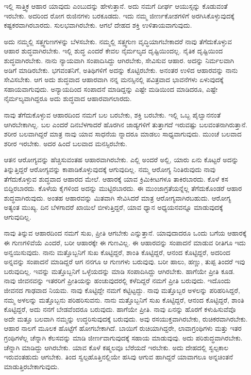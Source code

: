 ಇಲ್ಲಿ ಸಾತ್ತ್ವಿಕ ಆಹಾರ ಯಾವುದು ಎಂಬುದನ್ನು ಹೇಳುತ್ತಾನೆ. ಅದು ನಮಗೆ ದೀರ್ಘ ಆಯುಸ್ಸನ್ನು ಕೊಡುವಂತೆ ಇರಬೇಕು. ಅದರಿಂದ ರೋಗ ರುಜಿನಗಳು ಬರಕೂಡದು. ಇದು ನಮ್ಮ ಜೀರ್ಣಕೋಶಗಳಿಗೆ ಅರಗಿಸಿಕೊಳ್ಳುವುದಕ್ಕೆ ಕಷ್ಟಕರವಾಗಿರಬಾರದು. ಸುಲಭವಾಗಿರಬೇಕು. ಆಗಲೆ ದೇಹದ ಶಕ್ತಿ ಉಳಿತಾಯವಾಗುವುದು.

ಅದು ನಮ್ಮಲ್ಲಿ ಸತ್ತ್ವಗುಣಗಳನ್ನು ಬೆಳಸಬೇಕು. ನಮ್ಮಲ್ಲಿ ಸತ್ತ್ವಗುಣ ವೃದ್ಧಿಯಾಗಬೇಕಾದರೆ ನಾವು ತೆಗೆದುಕೊಳ್ಳುವ ಆಹಾರ ಶುದ್ಧವಾಗಿರಬೇಕು. ಇಲ್ಲಿ ಶುದ್ಧ ಎಂದರೆ ಕೇವಲ ನೈರ್ಮಲ್ಯದ ದೃಷ್ಟಿಯಿಂದಲ್ಲ. ನೈತಿಕ ದೃಷ್ಟಿಯಿಂದ ಶುದ್ಧವಾಗಿರಬೇಕು. ನಾನು ನ್ಯಾಯವಾಗಿ ಸಂಪಾದಿಸಿದ್ದು ಆಗಿರಬೇಕು, ಸೇವಿಸುವ ಆಹಾರ. ಅದನ್ನು ನಿರ್ಮಲವಾಗಿ ಅಡಿಗೆ ಮಾಡಿರಬೇಕು. ಭಗವಂತನಿಗೆ, ಅತಿಥಿಗಳಿಗೆ ಅದನ್ನು ಕೊಟ್ಟಿರಬೇಕು. ಅನಂತರ ಉಳಿದ ಆಹಾರವನ್ನು ನಾನು ಸೇವಿಸಬೇಕು. ಆಗ ಅದು ಶುದ್ಧವಾದ ಆಹಾರವಾಗಿ ನನ್ನ ಮನಸ್ಸಿನಲ್ಲಿ ಪವಿತ್ರವಾದ ಭಾವನೆಗಳು ಏಳುವುದಕ್ಕೆ ಸಹಾಯವಾಗುವುದು. ಅನ್ಯಾಯದಿಂದ ಸಂಪಾದನೆ ಮಾಡಿದ್ದನ್ನು ಎಷ್ಟೇ ಮಡಿಯಿಂದ ಮಾಡಿದರೂ, ಎಷ್ಟೇ ನೈರ್ಮಲ್ಯವಾಗಿದ್ದರೂ ಅದು ಶುದ್ಧವಾದ ಆಹಾರವಾಗಲಾರದು.

ನಾವು ತೆಗೆದುಕೊಳ್ಳುವ ಆಹಾರದಿಂದ ನಮಗೆ ಬಲ ಬರಬೇಕು, ಶಕ್ತಿ ಬರಬೇಕು. ಇಲ್ಲಿ ಒಬ್ಬ ಪೈಲ್ವಾನನಂತೆ ಆಗಿರಬೇಕಾಗಿಲ್ಲ. ಬಲ ಎಂದರೆ ದಿನಬೆಳಗಾದರೆ ಹೊರಗಿನ ಜಾಡ್ಯಗಳಿಗೆ ತುತ್ತಾಗದೆ ಇರುವಷ್ಟು ಬಲವಂತನಾಗಿರುತ್ತಾನೆ. ಶರೀರ ಬಲವಾಗಿದ್ದರೆ ಮಾತ್ರ ನಾವು ಯಾವ ಸಾಧನೆಯ ನ್ನಾದರೂ ಮಾಡಲು ಸಾಧ್ಯವಾಗುವುದು. ಮುಂಚೆ ಬಲವಾದ ಶರೀರ ಇರಬೇಕು. ಅದರ ಹಿಂದೆ ಬಲವಾದ ಮನಸ್ಸಿರಬೇಕು.

ಆತನ ಆರೋಗ್ಯವನ್ನು ಹೆಚ್ಚಿಸುವಂತಹ ಆಹಾರವಾಗಿರಬೇಕು. ಎಲ್ಲಿ ಅಂದರೆ ಅಲ್ಲಿ, ಯಾರು ಏನು ಕೊಟ್ಟರೆ ಅದನ್ನು ತಿನ್ನುತ್ತಿದ್ದರೆ ಆರೋಗ್ಯವನ್ನು ಕಾಪಾಡಿಕೊಳ್ಳುವುದಕ್ಕೆ ಆಗುವುದಿಲ್ಲ. ನಮ್ಮ ಆರೋಗ್ಯ ನಿಂತಿರುವುದು ನಾವು ತೆಗೆದುಕೊಳ್ಳುವ ಶುದ್ಧವಾದ ಆಹಾರದ ಮೇಲೆ. ಆಹಾರಕ್ಕೆ ಯಾವ ಕ್ರಿಮಿಕೀಟಗಳೂ ತಾಕಿರಬಾರದು. ಕೊಳೆ ಕಸ ಬಿದ್ದಿರಬಾರದು. ಕೊಳೆಯ ಕೈಗಳಿಂದ ಅದನ್ನು ಮುಟ್ಟಿರಬಾರದು. ಈ ಮುಂಜಾಗ್ರತೆಯನ್ನೆಲ್ಲ ತೆಗೆದುಕೊಂಡರೆ ಆಹಾರ ಶುದ್ಧವಾಗಿರುವುದು. ಅಂತಹ ಆಹಾರವನ್ನು ಮಿತವಾಗಿ ಸೇವಿಸಿದರೆ ಮಾತ್ರ ಆರೋಗ್ಯವಾಗಿರಬಹುದು. ಆರೋಗ್ಯ ಅತ್ಯಂತ ಮುಖ್ಯ. ದಿನ ಬೆಳಗಾದರೆ ಖಾಯಿಲೆ ಬೀಳುತ್ತಿದ್ದರೆ, ಯಾವ ಧ್ಯಾನ ಅಧ್ಯಯನವನ್ನೂ ಮಾಡುವುದಕ್ಕೆ ಆಗುವುದಿಲ್ಲ.

ನಾವು ತಿನ್ನುವ ಆಹಾರದಿಂದ ನಮಗೆ ಸುಖ, ಪ್ರೀತಿ ಆಗಬೇಕು ಎನ್ನುತ್ತಾನೆ. ಯಾವುದಾದರೂ ಒಂದು ಬಗೆಯ ಆಹಾರಕ್ಕೆ ಈ ಗುಣಗಳಿವೆಯೆ ಎಂದರೆ, ಬರೀ ಆಹಾರಕ್ಕೇ ಈ ಗುಣವಿಲ್ಲ. ಈ ಆಹಾರವನ್ನು ಸಂಪಾದನೆ ಮಾಡುವ ರೀತಿಗೂ ಇದು ಅನ್ವಯಿಸುವುದು. ನಾನು ಮತ್ತೊಬ್ಬನಿಗೆ ಸುಖ ಕೊಟ್ಟಿದ್ದರೆ, ಶಾಂತಿ ಕೊಟ್ಟಿದ್ದರೆ, ಆನಂದ ಕೊಟ್ಟಿದ್ದರೆ, ಅದರಿಂದ ಅನ್ನವನ್ನು ಸಂಪಾದನೆ ಮಾಡಿದ್ದರೆ ಆಗ ನನಗೂ ಆ ಗುಣಗಳು ಬರುವುವು. ಬರೀ ಹಾಲು, ಹಣ್ಣು, ತುಪ್ಪ ತಿಂದರೆ ಇವು ಬರುವುದಿಲ್ಲ. ಇವನ್ನು ಮತ್ತೊಬ್ಬನಿಗೆ ಒಳ್ಳೆಯದನ್ನು ಮಾಡಿ ಸಂಪಾದಿಸಿದ್ದು ಆಗಿರಬೇಕು. ಹಾಗೆಯೇ ಪ್ರೀತಿ ಕೂಡ. ನಾವು ಜೀವನವನ್ನು ಇತರರಿಗೆ ಪ್ರೀತಿಯನ್ನು ಹಂಚುವುದರಲ್ಲಿ ಕಳೆದಿದ್ದರೆ ನಮಗೆ ಪ್ರೀತಿ ಬರುವುದು. ಇದೊಂದು ಜೀವನದ ಗಾಢವಾದ ನಿಯಮ. ನಾವು ಕೊಟ್ಟಿದ್ದೇ ನಮಗೆ ಕಟ್ಟಿಟ್ಟದ್ದು. ನಾವು ಮತ್ತೊಬ್ಬರ ಅಳಲನ್ನು ಪರಿಹರಿಸಿದ್ದರೆ, ನಮ್ಮ ಅಳಲನ್ನು ಮತ್ತೊಬ್ಬನು ಪರಿಹರಿಸುವನು. ನಾನು ಮತ್ತೊಬ್ಬನಿಗೆ ಸುಖ ಕೊಟ್ಟಿದ್ದರೆ, ಆನಂದ ಕೊಟ್ಟಿದ್ದರೆ, ಶಾಂತಿ ಕೊಟ್ಟಿದ್ದರೆ, ಅದು ನನಗೆ ಬೇಡವೆಂದರೂ ಬರುವುದು. ಹಾಗೆಯೇ ಪ್ರೀತಿ. ನಾವು ಏನನ್ನು ಹೊರಗೆ ಕಳುಹಿಸುವೆವೊ ಅದೇ ಮತ್ತೂ ಬಲವಾಗಿ ನಮ್ಮನ್ನು ಉದ್ಧರಿಸುವುದಕ್ಕೆ ಬರುವುದು. ಅವು ರಸಯುಕ್ತವಾಗಿರಬೇಕು, ರುಚಿಕರವಾಗಿರಬೇಕು. ಆಹಾರ ನಾಲಗೆ ಮೂಲಕ ಹೊಟ್ಟೆಗೆ ಹೋಗಬೇಕಾಗಿದೆ. ಬಾಯಿಗೆ ರುಚಿಯಾಗಿದ್ದರೇ, ಲಾವಾಗ್ರಂಥಿಗಳು ಮತ್ತು ಇತರ ಗ್ರಂಥಿಗಳೆಲ್ಲ ಚೆನ್ನಾಗಿ ಕೆಲಸವನ್ನು ಮಾಡಿ ಜೀರ್ಣವಾಗುವುದಕ್ಕೆ ಸಹಾಯ ಮಾಡುವುವು. ಅದು ಪರಿಶುದ್ಧವಾಗಿರಬೇಕು. ಚೆನ್ನಾಗಿ ಮಾಡಿದ್ದು ಆಗಿರಬೇಕು. ಯಾವ ಕೊಳೆ ಕಷ್ಮಲವೂ ಬೆರೆಯದೆ ಇರಬೇಕು. ಅದು ದೇಹದಲ್ಲಿ ಸ್ವಲ್ಪಕಾಲ ಇರುವಂತಹುದು ಆಗಬೇಕು. ತಿಂದ ಸ್ವಲ್ಪಹೊತ್ತಿನಲ್ಲಿಯೇ ಹಸಿವು ಆಗುವ ಹಾಗಿದ್ದರೆ ಯಾವಾಗಲೂ ಅನ್ನಚಿಂತನೆ ಮಾಡುತ್ತಿರಬೇಕಾಗುವುದು.

